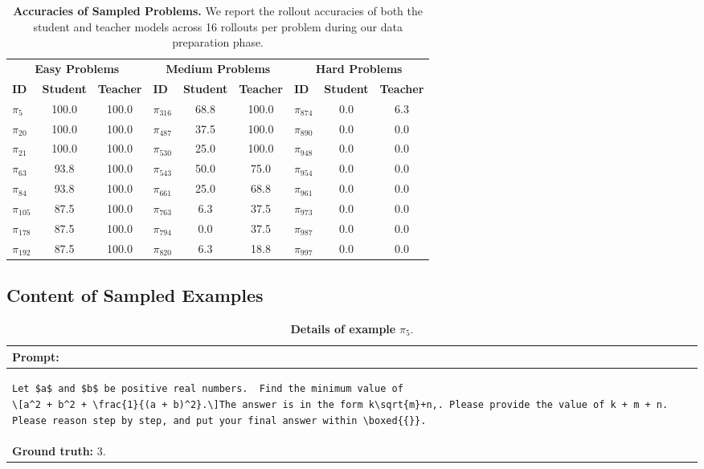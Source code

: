 \begin{table}[htbp]
\centering
\caption{\textbf{Accuracies of Sampled Problems.} We report the rollout accuracies of both the student and teacher models across 16 rollouts per problem during our data preparation phase.}
\label{tab:opd_accuracies}
\small
\begin{tabular}{lcc|lcc|lcc}
\toprule
\multicolumn{3}{c}{\textbf{Easy Problems}} & \multicolumn{3}{c}{\textbf{Medium Problems}} & \multicolumn{3}{c}{\textbf{Hard Problems}} \\
\cmidrule(lr){1-3} \cmidrule(lr){4-6} \cmidrule(lr){7-9}
\textbf{ID} & \textbf{Student} & \textbf{Teacher} & \textbf{ID} & \textbf{Student} & \textbf{Teacher} & \textbf{ID} & \textbf{Student} & \textbf{Teacher} \\
\midrule
$\pi_{5}$  & 100.0 & 100.0 & $\pi_{316}$ & 68.8 & 100.0 & $\pi_{874}$ & 0.0 & 6.3  \\
$\pi_{20}$  & 100.0 & 100.0 & $\pi_{487}$ & 37.5 & 100.0 & $\pi_{890}$ & 0.0 & 0.0  \\
$\pi_{21}$  & 100.0 & 100.0 & $\pi_{530}$ & 25.0 & 100.0 & $\pi_{948}$ & 0.0 & 0.0  \\
$\pi_{63}$  & 93.8  & 100.0 & $\pi_{543}$ & 50.0 & 75.0  & $\pi_{954}$ & 0.0 & 0.0  \\
$\pi_{84}$  & 93.8  & 100.0 & $\pi_{661}$ & 25.0 & 68.8  & $\pi_{961}$ & 0.0 & 0.0  \\
$\pi_{105}$ & 87.5  & 100.0  & $\pi_{763}$ & 6.3  & 37.5  & $\pi_{973}$ & 0.0 & 0.0  \\
$\pi_{178}$ & 87.5  & 100.0 & $\pi_{794}$ & 0.0  & 37.5  & $\pi_{987}$ & 0.0 & 0.0  \\
$\pi_{192}$ & 87.5  & 100.0   & $\pi_{820}$ & 6.3  & 18.8  & $\pi_{997}$ & 0.0 & 0.0  \\
\bottomrule
\end{tabular}
\end{table}

\subsection{Content of Sampled Examples}

\begin{table}[htbp]
\centering
\caption{\textbf{Details of example} $\pi_{5}$.}
\begin{tabular}{p{}}
\toprule
\textbf{Prompt:} \\
\midrule
\footnotesize
\begin{lstlisting}[breaklines=true, basicstyle=\ttfamily, aboveskip=-1.0em, belowskip=0pt, breakindent=0pt]
Let $a$ and $b$ be positive real numbers.  Find the minimum value of
\[a^2 + b^2 + \frac{1}{(a + b)^2}.\]The answer is in the form k\sqrt{m}+n,. Please provide the value of k + m + n. Please reason step by step, and put your final answer within \boxed{{}}.
\end{lstlisting} \\
\midrule
\textbf{Ground truth:} $3$. \\
\bottomrule
\end{tabular}
\end{table}


